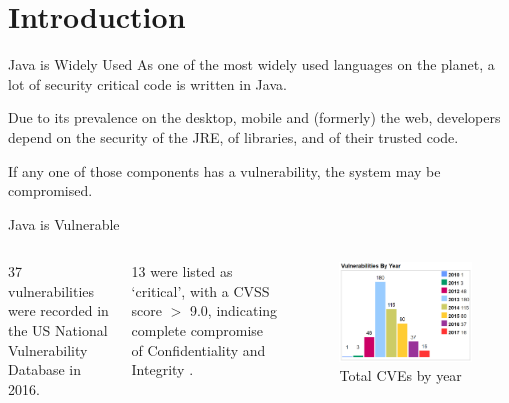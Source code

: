 \section{Introduction}

\begin{frame}{Java is Widely Used}
	As one of the most widely used languages on the planet, a lot of security critical code is written in Java.
	
	Due to its prevalence on the desktop, mobile and (formerly) the web, developers depend on the security of the JRE, of libraries, and of their trusted code.
	
	If any one of those components has a vulnerability, the system may be compromised.
\end{frame}

\begin{frame}{Java is Vulnerable}
	\begin{columns}
			37 vulnerabilities were recorded in the US National Vulnerability Database in 2016.\newline
			
			13 were listed as `critical', with a CVSS score $ > $ 9.0, indicating complete compromise of Confidentiality and Integrity \cite{nvd:jdk2016cvss9}.
		\begin{figure}
			\includegraphics[scale=0.25]{content/images/cvedetails_vulnsperyear.png}
			\caption{Total CVEs by year \cite{cvedetails:jdk2016}}
		\end{figure}
	\end{columns}	
\end{frame}

